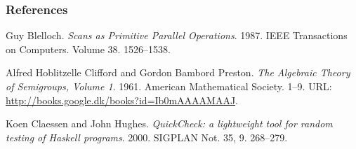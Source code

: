 \begin{frame}

\frametitle{References\footnotemark[7]}

\begin{thebibliography}{9}


Guy Blelloch. \emph{Scans as Primitive Parallel Operations}. 1987. IEEE
Transactions on Computers. Volume 38. 1526--1538.


Alfred Hoblitzelle Clifford and Gordon Bambord Preston. \emph{The Algebraic
Theory of Semigroups, Volume 1}. 1961. American Mathematical Society. 1--9.
URL: \url{http://books.google.dk/books?id=Ib0mAAAAMAAJ}.


Koen Claessen and John Hughes. \emph{QuickCheck: a lightweight tool for random
testing of Haskell programs}. 2000. SIGPLAN Not. 35, 9. 268--279.

\end{thebibliography}


\end{frame}
